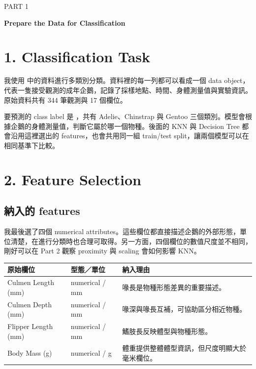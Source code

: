 \begin{center}
  {\color{accent}\large PART 1}\par
  \vspace{0.25em}
  {\Large\bfseries Prepare the Data for Classification}\par
\end{center}

\vspace{0.8em}

\section*{1. Classification Task}
\sectionrule

我使用  中的資料進行多類別分類。資料裡的每一列都可以看成一個 data object，代表一隻接受觀測的成年企鵝，記錄了採樣地點、時間、身體測量值與實驗資訊。原始資料共有 344 筆觀測與 17 個欄位。

要預測的 class label 是 ，共有 Adelie、Chinstrap 與 Gentoo 三個類別。模型會根據企鵝的身體測量值，判斷它屬於哪一個物種。後面的 KNN 與 Decision Tree 都會沿用這裡選出的 features，也會共用同一組 train/test split，讓兩個模型可以在相同基準下比較。

\section*{2. Feature Selection}
\sectionrule

\subsection*{納入的 features}

我最後選了四個 numerical attributes。這些欄位都直接描述企鵝的外部形態，單位清楚，在進行分類時也合理可取得。另一方面，四個欄位的數值尺度並不相同，剛好可以在 Part 2 觀察 proximity 與 scaling 會如何影響 KNN。

\begin{table}[H]
\centering
\small
\begin{tabularx}{\linewidth}{L{4.0cm}L{2.2cm}Y}
\toprule
\textbf{原始欄位} & \textbf{型態／單位} & \textbf{納入理由} \\
\midrule
Culmen Length (mm) & numerical / mm & 喙長是物種形態差異的重要描述。 \\
Culmen Depth (mm) & numerical / mm & 喙深與喙長互補，可協助區分相近物種。 \\
Flipper Length (mm) & numerical / mm & 鰭肢長反映體型與物種形態。 \\
Body Mass (g) & numerical / g & 體重提供整體體型資訊，但尺度明顯大於毫米欄位。 \\
\bottomrule
\end{tabularx}
\end{table}

